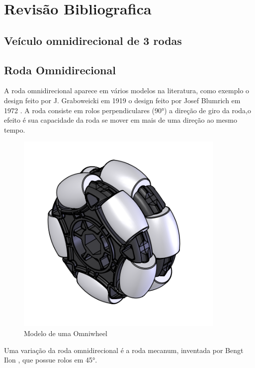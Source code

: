 
\chapter{Revisão Bibliografica}

\section{Veículo omnidirecional de 3 rodas}


\section{Roda Omnidirecional}

A roda omnidirecional aparece em vários modelos na literatura, como exemplo o design feito por J. Graboweicki em 1919 \cite{patent_US1305535A}
o design feito por Josef Blumrich em 1972 \cite{patent_US3789947A}.
A roda consiste em rolos perpendiculares (90°) a direção de giro da roda,o efeito é sua capacidade da roda se mover em mais de uma direção ao mesmo tempo.

\begin{figure}[h]
	\centering
	\includegraphics{figures/omniwheel}
	\caption{Modelo de uma Omniwheel \cite{draw_omniwheel}}
\end{figure}

Uma variação da roda omnidirecional é a roda mecanum, inventada por Bengt Ilon \cite{patent_US3876255A}, que possue rolos em 45°.


